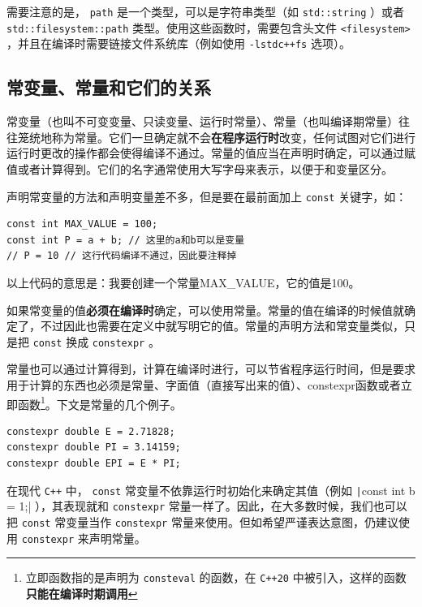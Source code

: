 需要注意的是， \verb|path| 是一个类型，可以是字符串类型（如 \verb|std::string| ）或者 \verb|std::filesystem::path| 类型。使用这些函数时，需要包含头文件 \verb|<filesystem>| ，并且在编译时需要链接文件系统库（例如使用 \verb|-lstdc++fs| 选项）。

\subsection{常变量、常量和它们的关系}
常变量（也叫不可变变量、只读变量、运行时常量）、常量（也叫编译期常量）往往笼统地称为常量。它们一旦确定就不会\textbf{在程序运行时}改变，任何试图对它们进行运行时更改的操作都会使得编译不通过。常量的值应当在声明时确定，可以通过赋值或者计算得到。它们的名字通常使用大写字母来表示，以便于和变量区分。

声明常变量的方法和声明变量差不多，但是要在最前面加上 \texttt{const} 关键字，如：
\begin{verbatim}
const int MAX_VALUE = 100;
const int P = a + b; // 这里的a和b可以是变量
// P = 10 // 这行代码编译不通过，因此要注释掉
\end{verbatim}
以上代码的意思是：我要创建一个常量MAX\_VALUE，它的值是100。

如果常变量的值\textbf{必须在编译时}确定，可以使用常量。常量的值在编译的时候值就确定了，不过因此也需要在定义中就写明它的值。常量的声明方法和常变量类似，只是把 \texttt{const} 换成 \texttt{constexpr} 。

常量也可以通过计算得到，计算在编译时进行，可以节省程序运行时间，但是要求用于计算的东西也必须是常量、字面值（直接写出来的值）、constexpr函数或者立即函数\footnote{立即函数指的是声明为 \texttt{consteval} 的函数，在 \texttt{C++20} 中被引入，这样的函数\textbf{只能在编译时期调用}}。下文是常量的几个例子。

\begin{verbatim}
constexpr double E = 2.71828;
constexpr double PI = 3.14159;
constexpr double EPI = E * PI;
\end{verbatim}

在现代 \texttt{C++} 中， \texttt{const} 常变量不依靠运行时初始化来确定其值（例如 \texttt|const int b = 1;| ），其表现就和 \texttt{constexpr} 常量一样了。因此，在大多数时候，我们也可以把 \texttt{const} 常变量当作 \texttt{constexpr} 常量来使用。但如希望严谨表达意图，仍建议使用 \texttt{constexpr} 来声明常量。

